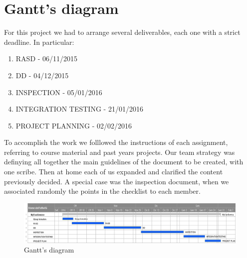 \section{ Gantt's diagram}
For this project we had to arrange several deliverables, each one with a strict deadline.
In particular:
\begin{enumerate}
\item RASD - 06/11/2015
\item DD - 04/12/2015
\item INSPECTION - 05/01/2016
\item INTEGRATION TESTING - 21/01/2016
\item PROJECT PLANNING - 02/02/2016
\end{enumerate}

To accomplish the work we folllowed the instructions of each assignment, referring 
to course material and past years projects.
Our team strategy was definying  all together the main guidelines of the document to be created, with one 
scribe. Then at home each of us expanded and clarified the content previously decided.
A special case was the inspection document, when we associated randomly the points in the checklist to each member.

\begin{center}
\begin{figure} [h]
\centering
  	  \includegraphics[scale=0.4]{chapters/SWE2-4.png}
\caption{Gantt's diagram}
 \end{figure}
\end{center}
